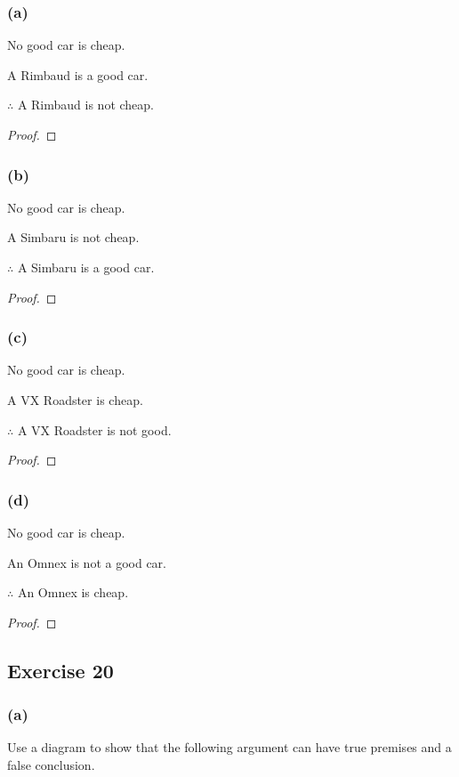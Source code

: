 \documentclass[14pt]{extarticle}
\begin{document}
\subsubsection{(a)}
No good car is cheap.

A Rimbaud is a good car.

$\therefore$ A Rimbaud is not cheap.

\begin{proof}

\end{proof}

\subsubsection{(b)}
No good car is cheap.

A Simbaru is not cheap.

$\therefore$ A Simbaru is a good car.

\begin{proof}

\end{proof}

\subsubsection{(c)}
No good car is cheap.

A VX Roadster is cheap.

$\therefore$ A VX Roadster is not good.

\begin{proof}

\end{proof}

\subsubsection{(d)}
No good car is cheap.

An Omnex is not a good car.

$\therefore$ An Omnex is cheap.

\begin{proof}

\end{proof}

\subsection{Exercise 20}

\subsubsection{(a)}
Use a diagram to show that the following argument can have true premises and a false conclusion.
\end{document}
